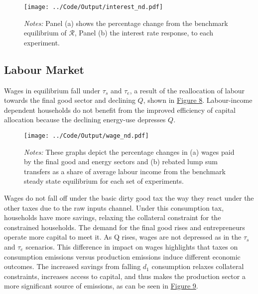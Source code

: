 \documentclass[12pt,a4paper]{article}
\begin{document}
\begin{figure}[h]
    \centering
 	
    \texttt{[image: ../Code/Output/interest\_nd.pdf]} 
    \captionsetup{font=footnotesize}
       \caption*{\textit{Notes:} Panel (a) shows the percentage change from the benchmark equilibrium of $\mathcal{R}$, Panel (b) the interest rate response, to each experiment.}
     \label{fig:interest}
\end{figure}

\subsection{Labour Market}

\hspace*{6mm} Wages in equilibrium fall under $\tau_s$ and $\tau_e$, a result of the reallocation of labour towards the final good sector and declining $Q$, shown in \hyperref[fig:wage]{Figure 8}. Labour-income dependent households do not benefit from the improved efficiency of capital allocation because the declining energy-use depresses $Q$.

\begin{figure}[hbtp]
    \centering

    \texttt{[image: ../Code/Output/wage\_nd.pdf]}    
    \captionsetup{font=footnotesize}
        \caption*{\textit{Notes:} These graphs depict the percentage changes in (a) wages paid by the final good and energy sectors and (b) rebated lump sum transfers as a share of average labour income from the benchmark steady state equilibrium for each set of experiments.}
     \label{fig:wage} 
\end{figure}

\hspace*{6mm} Wages do not fall off under the basic dirty good tax the way they react under the other taxes due to the raw inputs channel. Under this consumption tax, households have more savings, relaxing the collateral constraint for the constrained households. The demand for the final good rises and entrepreneurs operate more capital to meet it. As Q rises, wages are not depressed as in the $\tau_s$ and $\tau_e$ scenarios. This difference in impact on wages highlights that taxes on consumption emissions versus production emissions induce different economic outcomes. The increased savings from falling $d_1$ consumption relaxes collateral constraints, increases access to capital, and thus makes the production sector a more significant source of emissions, as can be seen in \hyperref[fig:sector]{Figure 9}.
\end{document}
